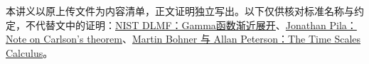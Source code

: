 \documentclass[11pt,a4paper]{article}
\begin{document}
本讲义以原上传文件为内容清单，正文证明独立写出。以下仅供核对标准名称与约定，不代替文中的证明：\href{https://dlmf.nist.gov/5.11}{NIST
DLMF：Gamma函数渐近展开}、\href{https://people.maths.ox.ac.uk/pila/carlson.pdf}{Jonathan
Pila：Note on Carlson's
theorem}、\href{https://www.math.unl.edu/~apeterson1/pub/bpexp.pdf}{Martin
Bohner 与 Allan Peterson：The Time Scales Calculus}。
\end{document}
